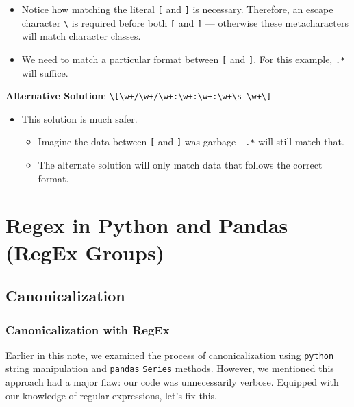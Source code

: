 \documentclass[
  letterpaper,
  DIV=11,
  numbers=noendperiod]{scrreprt}
\providecommand{\tightlist}{%
  \setlength{\itemsep}{0pt}\setlength{\parskip}{0pt}}\usepackage{longtable,booktabs,array}
\begin{document}
\begin{itemize}
\tightlist
\item
  Notice how matching the literal \texttt{{[}} and \texttt{{]}} is
  necessary. Therefore, an escape character \texttt{\textbackslash{}} is
  required before both \texttt{{[}} and \texttt{{]}} --- otherwise these
  metacharacters will match character classes.
\item
  We need to match a particular format between \texttt{{[}} and
  \texttt{{]}}. For this example, \texttt{.*} will suffice.
\end{itemize}

\textbf{Alternative Solution}:
\texttt{\textbackslash{}{[}\textbackslash{}w+/\textbackslash{}w+/\textbackslash{}w+:\textbackslash{}w+:\textbackslash{}w+:\textbackslash{}w+\textbackslash{}s-\textbackslash{}w+\textbackslash{}{]}}

\begin{itemize}
\tightlist
\item
  This solution is much safer.

  \begin{itemize}
  \tightlist
  \item
    Imagine the data between \texttt{{[}} and \texttt{{]}} was garbage -
    \texttt{.*} will still match that.
  \item
    The alternate solution will only match data that follows the correct
    format.
  \end{itemize}
\end{itemize}

\section{Regex in Python and Pandas (RegEx
Groups)}\label{regex-in-python-and-pandas-regex-groups}

\subsection{Canonicalization}\label{canonicalization-1}

\subsubsection{Canonicalization with
RegEx}\label{canonicalization-with-regex}

Earlier in this note, we examined the process of canonicalization using
\texttt{python} string manipulation and \texttt{pandas} \texttt{Series}
methods. However, we mentioned this approach had a major flaw: our code
was unnecessarily verbose. Equipped with our knowledge of regular
expressions, let's fix this.
\end{document}
